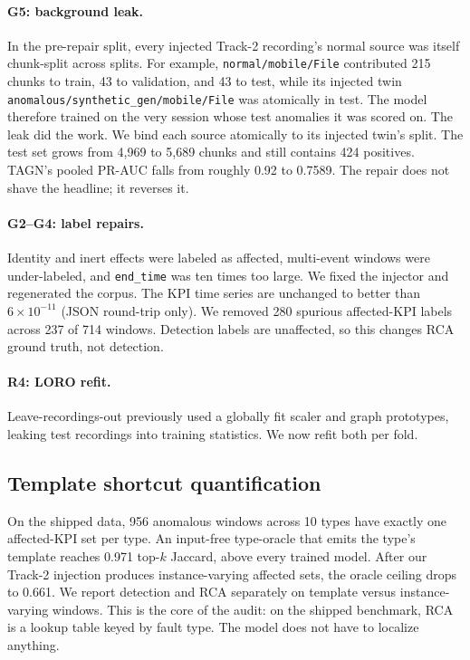 \documentclass[conference]{IEEEtran}
\begin{document}
\paragraph{G5: background leak.}
In the pre-repair split, every injected Track-2 recording's normal source was itself chunk-split across splits. For example, \texttt{normal/mobile/File} contributed 215 chunks to train, 43 to validation, and 43 to test, while its injected twin \texttt{anomalous/synthetic\_gen/mobile/File} was atomically in test. The model therefore trained on the very session whose test anomalies it was scored on. The leak did the work. We bind each source atomically to its injected twin's split. The test set grows from 4,969 to 5,689 chunks and still contains 424 positives. TAGN's pooled PR-AUC falls from roughly 0.92 to 0.7589. The repair does not shave the headline; it reverses it.

\paragraph{G2--G4: label repairs.}
Identity and inert effects were labeled as affected, multi-event windows were under-labeled, and \texttt{end\_time} was ten times too large. We fixed the injector and regenerated the corpus. The KPI time series are unchanged to better than $6\times10^{-11}$ (JSON round-trip only). We removed 280 spurious affected-KPI labels across 237 of 714 windows. Detection labels are unaffected, so this changes RCA ground truth, not detection.

\paragraph{R4: LORO refit.}
Leave-recordings-out previously used a globally fit scaler and graph prototypes, leaking test recordings into training statistics. We now refit both per fold.

\subsection{Template shortcut quantification}

On the shipped data, 956 anomalous windows across 10 types have exactly one affected-KPI set per type. An input-free type-oracle that emits the type's template reaches 0.971 top-$k$ Jaccard, above every trained model. After our Track-2 injection produces instance-varying affected sets, the oracle ceiling drops to 0.661. We report detection and RCA separately on template versus instance-varying windows. This is the core of the audit: on the shipped benchmark, RCA is a lookup table keyed by fault type. The model does not have to localize anything.
\end{document}

